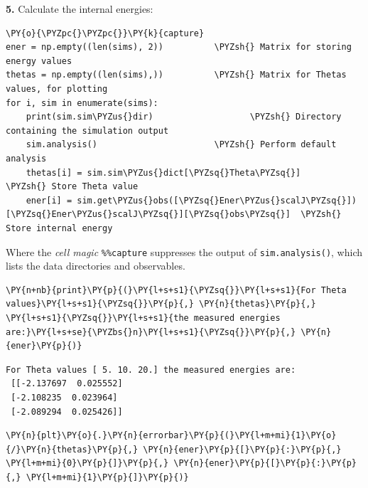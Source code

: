     \textbf{5.} Calculate the internal energies:

    \begin{tcolorbox}[breakable, size=fbox, boxrule=1pt, pad at break*=1mm,colback=cellbackground, colframe=cellborder]
\begin{Verbatim}[commandchars=\\\{\}]
\PY{o}{\PYZpc{}\PYZpc{}}\PY{k}{capture}
ener = np.empty((len(sims), 2))          \PYZsh{} Matrix for storing energy values
thetas = np.empty((len(sims),))          \PYZsh{} Matrix for Thetas values, for plotting
for i, sim in enumerate(sims):
    print(sim.sim\PYZus{}dir)                   \PYZsh{} Directory containing the simulation output
    sim.analysis()                       \PYZsh{} Perform default analysis
    thetas[i] = sim.sim\PYZus{}dict[\PYZsq{}Theta\PYZsq{}]                           \PYZsh{} Store Theta value
    ener[i] = sim.get\PYZus{}obs([\PYZsq{}Ener\PYZus{}scalJ\PYZsq{}])[\PYZsq{}Ener\PYZus{}scalJ\PYZsq{}][\PYZsq{}obs\PYZsq{}]  \PYZsh{} Store internal energy
\end{Verbatim}
\end{tcolorbox}

    Where the \emph{cell magic} \texttt{\%\%capture} suppresses the output
of \texttt{sim.analysis()}, which lists the data directories and
observables.

    \begin{tcolorbox}[breakable, size=fbox, boxrule=1pt, pad at break*=1mm,colback=cellbackground, colframe=cellborder]
\begin{Verbatim}[commandchars=\\\{\}]
\PY{n+nb}{print}\PY{p}{(}\PY{l+s+s1}{\PYZsq{}}\PY{l+s+s1}{For Theta values}\PY{l+s+s1}{\PYZsq{}}\PY{p}{,} \PY{n}{thetas}\PY{p}{,} \PY{l+s+s1}{\PYZsq{}}\PY{l+s+s1}{the measured energies are:}\PY{l+s+se}{\PYZbs{}n}\PY{l+s+s1}{\PYZsq{}}\PY{p}{,} \PY{n}{ener}\PY{p}{)}
\end{Verbatim}
\end{tcolorbox}

    \begin{Verbatim}[commandchars=\\\{\}]
For Theta values [ 5. 10. 20.] the measured energies are:
 [[-2.137697  0.025552]
 [-2.108235  0.023964]
 [-2.089294  0.025426]]
    \end{Verbatim}

    \begin{tcolorbox}[breakable, size=fbox, boxrule=1pt, pad at break*=1mm,colback=cellbackground, colframe=cellborder]
\begin{Verbatim}[commandchars=\\\{\}]
\PY{n}{plt}\PY{o}{.}\PY{n}{errorbar}\PY{p}{(}\PY{l+m+mi}{1}\PY{o}{/}\PY{n}{thetas}\PY{p}{,} \PY{n}{ener}\PY{p}{[}\PY{p}{:}\PY{p}{,} \PY{l+m+mi}{0}\PY{p}{]}\PY{p}{,} \PY{n}{ener}\PY{p}{[}\PY{p}{:}\PY{p}{,} \PY{l+m+mi}{1}\PY{p}{]}\PY{p}{)}
\end{Verbatim}
\end{tcolorbox}

